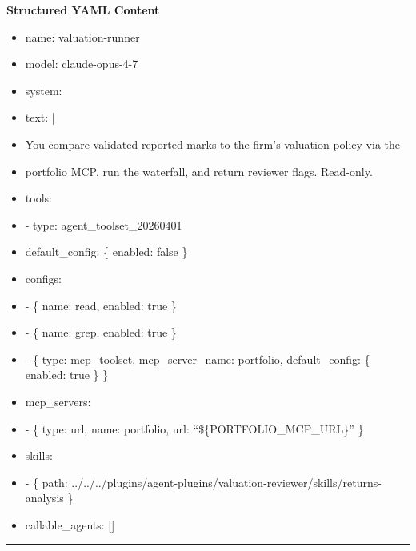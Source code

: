 \documentclass[11pt]{article}
\begin{document}
\textbf{Structured YAML Content}
\begin{itemize}[leftmargin=*,itemsep=2pt,topsep=2pt]
\item {} name: valuation-runner
\item {} model: claude-opus-4-7
\item {} system:
\item {} text: |
\item {} You compare validated reported marks to the firm's valuation policy via the
\item {} portfolio MCP, run the waterfall, and return reviewer flags. Read-only.
\item {} tools:
\item {} - type: agent\_\allowbreak{}toolset\_\allowbreak{}20260401
\item {} default\_\allowbreak{}config: \{ enabled: false \}
\item {} configs:
\item {} - \{ name: read, enabled: true \}
\item {} - \{ name: grep, enabled: true \}
\item {} - \{ type: mcp\_\allowbreak{}toolset, mcp\_\allowbreak{}server\_\allowbreak{}name: portfolio, default\_\allowbreak{}config: \{ enabled: true \} \}
\item {} mcp\_\allowbreak{}servers:
\item {} - \{ type: url, name: portfolio, url: ``\$\{PORTFOLIO\_\allowbreak{}MCP\_\allowbreak{}URL\}'' \}
\item {} skills:
\item {} - \{ path: ../../../plugins/agent-plugins/valuation-reviewer/skills/returns-analysis \}
\item {} callable\_\allowbreak{}agents: []
\end{itemize}

\vspace{0.8em}\hrule\vspace{0.8em}
\end{document}
